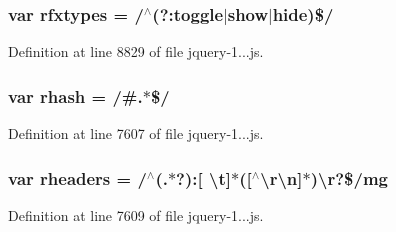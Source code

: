 \subsubsection[{\texorpdfstring{rfxtypes}{rfxtypes}}]{\setlength{\rightskip}{0pt plus 5cm}var rfxtypes = /$^\wedge$(?\+:{\bf toggle}$\vert$show$\vert$hide)\$/}\hypertarget{_scripts_2jquery-1_810_82_8js_a28b1e14ecaade6675453a292b2c1dba6}{}\label{_scripts_2jquery-1_810_82_8js_a28b1e14ecaade6675453a292b2c1dba6}


Definition at line 8829 of file jquery-\/1...\+js.

\subsubsection[{\texorpdfstring{rhash}{rhash}}]{\setlength{\rightskip}{0pt plus 5cm}var rhash = /\#.$\ast$\$/}\hypertarget{_scripts_2jquery-1_810_82_8js_a6990b6955b6bec9dd39f3814cfb56d6d}{}\label{_scripts_2jquery-1_810_82_8js_a6990b6955b6bec9dd39f3814cfb56d6d}


Definition at line 7607 of file jquery-\/1...\+js.

\subsubsection[{\texorpdfstring{rheaders}{rheaders}}]{\setlength{\rightskip}{0pt plus 5cm}var rheaders = /$^\wedge$(.$\ast$?)\+:\mbox{[} \textbackslash{}{\bf t}\mbox{]}$\ast$(\mbox{[}$^\wedge$\textbackslash{}{\bf r\textbackslash{}n}\mbox{]}$\ast$)\textbackslash{}{\bf r}?\$/mg}\hypertarget{_scripts_2jquery-1_810_82_8js_af506d11612139f03091db71089d92e8b}{}\label{_scripts_2jquery-1_810_82_8js_af506d11612139f03091db71089d92e8b}


Definition at line 7609 of file jquery-\/1...\+js.

